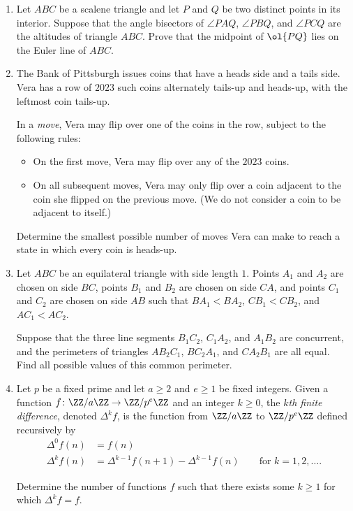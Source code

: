 \documentclass[11pt]{scrartcl}
\begin{document}
\begin{enumerate}[\bfseries 1.]
\item %
Let $ABC$ be a scalene triangle
and let $P$ and $Q$ be two distinct points in its interior.
Suppose that the angle bisectors of $\angle PAQ$, $\angle PBQ$,
and $\angle PCQ$ are the altitudes of triangle $ABC$.
Prove that the midpoint of $\ol{PQ}$ lies on the Euler line of $ABC$.

\item %
The Bank of Pittsburgh issues coins that have a heads side and a tails side.
Vera has a row of $2023$ such coins alternately tails-up and heads-up,
with the leftmost coin tails-up.

In a \emph{move}, Vera may flip over one of the coins in the row,
subject to the following rules:
\begin{itemize}
  \item On the first move, Vera may flip over any of the $2023$ coins.
  \item On all subsequent moves, Vera may only flip over
    a coin adjacent to the coin she flipped on the previous move.
  (We do not consider a coin to be adjacent to itself.)
\end{itemize}
Determine the smallest possible number of moves Vera can
make to reach a state in which every coin is heads-up.

\item %
Let $ABC$ be an equilateral triangle with side length $1$.
Points $A_1$ and $A_2$ are chosen on side $BC$,
points $B_1$ and $B_2$ are chosen on side $CA$, and
points $C_1$ and $C_2$ are chosen on side $AB$
such that $BA_1 < BA_2$, $CB_1 < CB_2$, and $AC_1 < AC_2$.

Suppose that the three line segments $B_1C_2$, $C_1A_2$, and $A_1B_2$
are concurrent, and the perimeters of triangles $AB_2C_1$, $BC_2A_1$, and
$CA_2B_1$ are all equal. Find all possible values of this common perimeter.

\item %
Let $p$ be a fixed prime and let $a \ge 2$ and $e \ge 1$ be fixed integers.
Given a function $f \colon \ZZ/a\ZZ \to \ZZ/p^e\ZZ$
and an integer $k \ge 0$, the \emph{$k$th finite difference},
denoted $\Delta^k f$, is the function from $\ZZ/a\ZZ$ to $\ZZ/p^e\ZZ$
defined recursively by
\begin{align*}
  \Delta^0 f(n) &= f(n) \\
  \Delta^k f(n) &= \Delta^{k-1} f(n+1) - \Delta^{k-1} f(n)
  \qquad \text{for } k = 1, 2, \dots.
\end{align*}

Determine the number of functions $f$ such that there exists some
$k \ge 1$ for which $\Delta^k f = f$.

\end{enumerate}
\pagebreak
\end{document}
